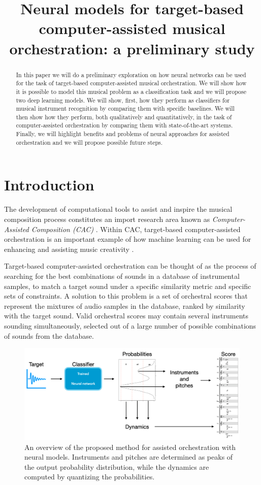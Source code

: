 \documentclass{article}
\title{Neural models for target-based computer-assisted musical orchestration: a preliminary study}
\begin{document}
%
\maketitle
%
\begin{abstract}
In this paper we will do a preliminary exploration on how neural networks can be used for the task of target-based computer-assisted musical orchestration. We will show how it is possible to model this  musical problem as a classification task and we will propose two deep learning models. We will show, first, how they perform as classifiers for musical instrument recognition by comparing them with specific baselines. We will then show how they perform, both qualitatively and quantitatively, in the task of computer-assisted orchestration by comparing them with state-of-the-art systems. Finally, we will highlight benefits and problems of neural approaches for assisted orchestration and we will propose possible future steps.
\end{abstract}
%
\section{Introduction}\label{sec:introduction}

The development of computational tools to assist and inspire the musical composition process constitutes an import research area known as \emph{Computer-Assisted Composition (CAC)} \cite{FerVic2013, Ari2005}. Within CAC, target-based computer-assisted orchestration is an important example of how machine learning can be used for {enhancing} and {assisting} music creativity \cite{Maresz2003}. 

Target-based computer-assisted orchestration can be thought of as the process of searching for the best combinations of sounds in a database of instrumental samples, to match a target sound under a specific similarity metric and specific sets of constraints. A solution to this problem is a set of orchestral scores that represent the mixtures of audio samples in the database, ranked by similarity with the target sound. 
Valid orchestral scores may contain several instruments sounding simultaneously, selected out of a large number of possible combinations of sounds from the database.

\begin{figure}
\includegraphics[scale=0.17]{figs/method.png}
\caption{An overview of the proposed method for assisted orchestration with neural models. Instruments and pitches are determined as peaks of the output probability distribution, while the dynamics are computed by quantizing the probabilities. \label{fig:method}}
\end{figure}
\end{document}
